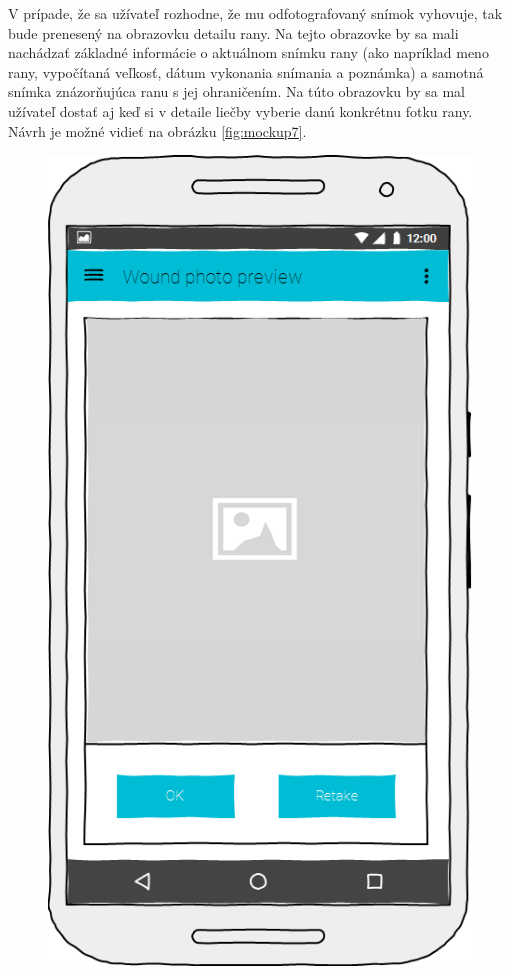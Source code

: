 V prípade, že sa užívateľ rozhodne, že mu odfotografovaný snímok vyhovuje, tak bude prenesený na obrazovku detailu rany. Na tejto obrazovke by sa mali nachádzať základné informácie o aktuálnom snímku rany (ako napríklad meno rany, vypočítaná veľkosť, dátum vykonania snímania a poznámka) a samotná snímka znázorňujúca ranu s jej ohraničením. Na túto obrazovku by sa mal užívateľ dostať aj keď si v detaile liečby vyberie danú konkrétnu fotku rany. Návrh je možné vidieť na obrázku \ref{fig:mockup7}.
\begin{figure}[h]
   \begin{minipage}{0.48\textwidth}
     \centering
     \includegraphics[scale=0.45]{fig/mockup6.png}

\end{minipage}
\end{figure}
